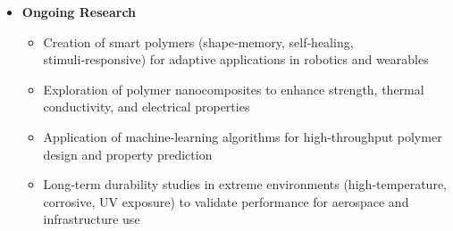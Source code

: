 \documentclass[11pt,a4paper]{article}
\begin{document}
\begin{itemize}
\begin{itemize}
\item Closed‑loop recycling strategies and chemical depolymerization processes to recover monomers and reduce waste
  \end{itemize}
\item \textbf{Ongoing Research}
  \begin{itemize}
\item Creation of smart polymers (shape‑memory, self‑healing, stimuli‑responsive) for adaptive applications in robotics and wearables
\item Exploration of polymer nanocomposites to enhance strength, thermal conductivity, and electrical properties
\item Application of machine‑learning algorithms for high‑throughput polymer design and property prediction
\item Long‑term durability studies in extreme environments (high‑temperature, corrosive, UV exposure) to validate performance for aerospace and infrastructure use
  \end{itemize}
\end{itemize}
\end{document}
